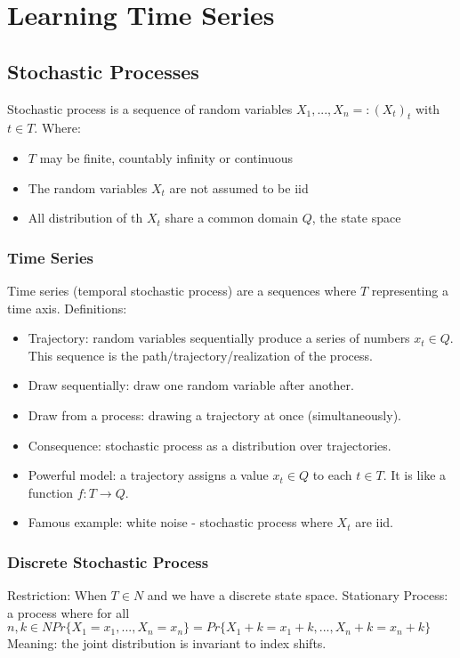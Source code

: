 \documentclass[main]{subfiles}
\begin{document}

\section{Learning Time Series}

\subsection{Stochastic Processes}
Stochastic process is a sequence of random variables
$X_1, . . . , X_n =: (X_t)_t$ with $t \in T$.
Where:
\begin{itemize}
\item $T$ may be finite, countably infinity or continuous
\item The random variables $X_t$ are not assumed to be iid
\item All distribution of th $X_t$ share a common domain $Q$, the state space
\end{itemize}

\subsubsection{Time Series}
Time series (temporal stochastic process) are a sequences where $T$ representing a time axis.
Definitions:
\begin{itemize}
\item Trajectory: random variables sequentially produce a series of numbers
$x_t \in Q$. This sequence is the path/trajectory/realization of the process.
\item Draw sequentially: draw one random variable after another.
\item Draw from a process: drawing a trajectory at once (simultaneously).
\item Consequence: stochastic process as a distribution over trajectories.
\item Powerful model: a trajectory assigns a value $x_t \in Q$ to each $t \in T$.
It is like a function $f: T \to Q$.
\item Famous example: white noise - stochastic process where $X_t$ are iid.
\end{itemize}

\subsubsection{Discrete Stochastic Process}
Restriction: When $T \in N$ and we have a discrete state space.
Stationary Process: a process where
for all $n,k \in N Pr\{X_1 = x_1, . . . , X_n = x_n\} = Pr\{X_1+k = x_1+k, . . . , X_n+k = x_n+k \}$
Meaning: the joint distribution is invariant to index shifts.
\end{document}
